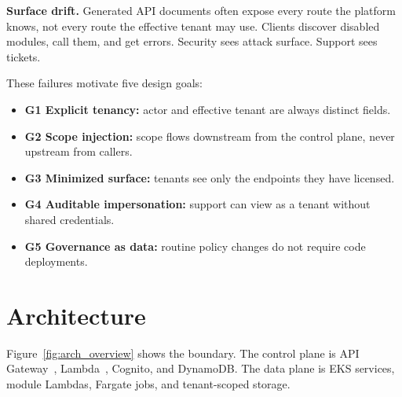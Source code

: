 \documentclass[10pt,journal]{IEEEtran}
\begin{document}
\textbf{Surface drift.} Generated API documents often expose every route the platform knows, not every route the effective tenant may use. Clients discover disabled modules, call them, and get errors. Security sees attack surface. Support sees tickets.

These failures motivate five design goals:

\begin{itemize}[label=\textcolor{causifyblue}{\textbullet}, leftmargin=1.2em, topsep=2pt, itemsep=1pt, parsep=0pt]
  \item \textbf{G1 Explicit tenancy:} actor and effective tenant are always distinct fields.
  \item \textbf{G2 Scope injection:} scope flows downstream from the control plane, never upstream from callers.
  \item \textbf{G3 Minimized surface:} tenants see only the endpoints they have licensed.
  \item \textbf{G4 Auditable impersonation:} support can view as a tenant without shared credentials.
  \item \textbf{G5 Governance as data:} routine policy changes do not require code deployments.
\end{itemize}

\section{Architecture}

Figure~\ref{fig:arch_overview} shows the boundary. The control plane is API Gateway~\cite{aws_api_gateway}, Lambda~\cite{aws_lambda_docs}, Cognito, and DynamoDB. The data plane is EKS services, module Lambdas, Fargate jobs, and tenant-scoped storage.
\end{document}
